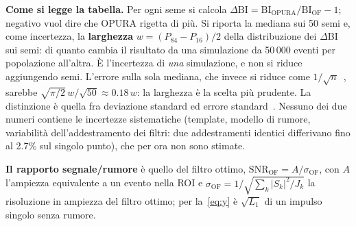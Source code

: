 \documentclass[11pt,a4paper]{article}
\begin{document}
\textbf{Come si legge la tabella.} Per ogni seme si calcola
$\Delta\mathrm{BI} = \mathrm{BI}_\text{OPURA}/\mathrm{BI}_\text{OF} - 1$; negativo vuol dire che
OPURA rigetta di più. Si riporta la mediana sui 50 semi e, come incertezza, la \textbf{larghezza}
$w = (P_{84}-P_{16})/2$ della distribuzione dei $\Delta$BI sui semi: di quanto cambia il risultato
da una simulazione da 50\,000 eventi per popolazione all'altra. È l'incertezza di \emph{una}
simulazione, e non si riduce aggiungendo semi. L'errore sulla sola mediana, che invece si riduce
come $1/\sqrt{n}$~\cite{PDGMC}, sarebbe $\sqrt{\pi/2}\,w/\sqrt{50} \approx 0.18\,w$: la larghezza è
la scelta più prudente. La distinzione è quella fra deviazione standard ed errore
standard~\cite{AltmanBland2005}. Nessuno dei due numeri contiene le incertezze sistematiche
(template, modello di rumore, variabilità dell'addestramento dei filtri: due addestramenti identici
differivano fino al 2.7\% sul singolo punto), che per ora non sono stimate.

\textbf{Il rapporto segnale/rumore} è quello del filtro ottimo,
$\mathrm{SNR}_\mathrm{OF} = A/\sigma_\mathrm{OF}$, con $A$ l'ampiezza equivalente a un evento nella
ROI e $\sigma_\mathrm{OF} = 1/\sqrt{\sum_k |S_k|^2/J_k}$ la risoluzione in ampiezza del filtro
ottimo; per la~\eqref{eq:y} è $\sqrt{L_1}$ di un impulso singolo senza rumore.
\end{document}
